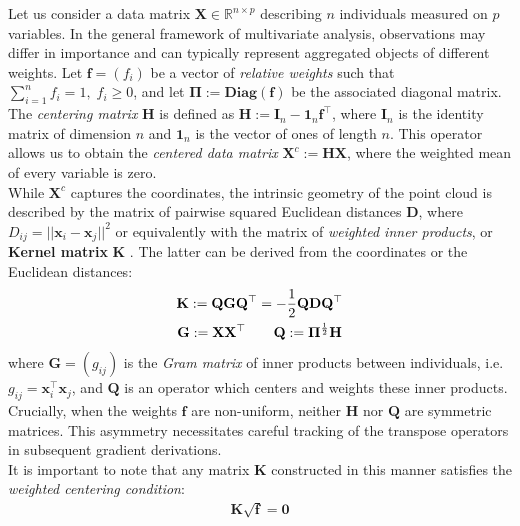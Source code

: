 \documentclass[11pt]{article}
\begin{document}
	Let us consider a data matrix $\mathbf{X} \in \mathbb{R}^{n \times p}$ describing $n$ individuals measured on $p$ variables. In the general framework of multivariate analysis, observations may differ in importance and can typically represent aggregated objects of different weights. Let $\mathbf{f} = (f_i)$ be a vector of \emph{relative weights} such that $\sum_{i=1}^n f_i = 1, \; f_i \geq 0$, and let $\bm{\Pi} := \textbf{Diag}(\mathbf{f})$ be the associated diagonal matrix. The \emph{centering matrix} $\mathbf{H}$ is defined as $\mathbf{H} := \mathbf{I}_n - \mathbf{1}_n \mathbf{f}^\top$, where $\mathbf{I}_n$ is the identity matrix of dimension $n$ and $\mathbf{1}_n$ is the vector of ones of length $n$. This operator allows us to obtain the \emph{centered data matrix} $\mathbf{X}^c := \mathbf{H}\mathbf{X}$, where the weighted mean of every variable is zero. \\
	
	While $\mathbf{X}^c$ captures the coordinates, the intrinsic geometry of the point cloud is described by the matrix of pairwise squared Euclidean distances $\mathbf{D}$, where $D_{ij} = ||\mathbf{x}_i - \mathbf{x}_j||^2$ or equivalently with the matrix of \emph{weighted inner products}, or \textbf{Kernel matrix} $\mathbf{K}$ \citep{bavaud_measuring_2024}. The latter can be derived from the coordinates or the Euclidean distances:
	\begin{gather} 
		\mathbf{K} := \mathbf{Q} \mathbf{G} \mathbf{Q}^\top = -\frac{1}{2} \mathbf{Q} \mathbf{D} \mathbf{Q}^\top \notag \\
		\mathbf{G} := \mathbf{X}\mathbf{X}^\top \qquad \mathbf{Q} := \bm{\Pi}^{\frac{1}{2}} \mathbf{H}  \label{std_kernel}
	\end{gather}
	where $\mathbf{G} = (g_{ij})$ is the \emph{Gram matrix} of inner products between individuals, i.e. $g_{ij} = \mathbf{x}_i^\top\mathbf{x}_j$, and $\mathbf{Q}$ is an operator which centers and weights these inner products. Crucially, when the weights $\mathbf{f}$ are non-uniform, neither $\mathbf{H}$ nor $\mathbf{Q}$ are symmetric matrices. This asymmetry necessitates careful tracking of the transpose operators in subsequent gradient derivations.\\
	
	It is important to note that any matrix $\mathbf{K}$ constructed in this manner satisfies the \emph{weighted centering condition}:
	\begin{align} 
		\mathbf{K} \sqrt{\mathbf{f}} = \mathbf{0}
	\end{align}
	
\end{document}
